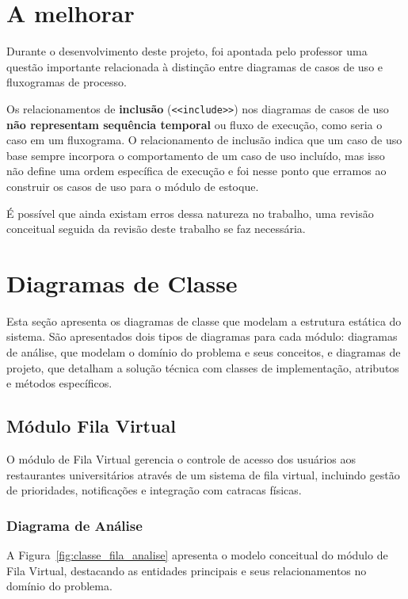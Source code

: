 \documentclass[12pt,a4paper]{article}
\begin{document}
\newpage
\section{A melhorar}


Durante o desenvolvimento deste projeto, foi apontada pelo professor uma questão importante relacionada à distinção entre diagramas de casos de uso e fluxogramas de processo. 

Os relacionamentos de \textbf{inclusão} (\texttt{<<include>>}) nos diagramas de casos de uso \textbf{não representam sequência temporal} ou fluxo de execução, como seria o caso em um fluxograma. O relacionamento de inclusão indica que um caso de uso base sempre incorpora o comportamento de um caso de uso incluído, mas isso não define uma ordem específica de execução e foi nesse ponto que erramos ao construir os casos de uso para o módulo de estoque. 

É possível que ainda existam erros dessa natureza no trabalho, uma revisão conceitual seguida da revisão deste trabalho se faz necessária.

\newpage
\section{Diagramas de Classe}

Esta seção apresenta os diagramas de classe que modelam a estrutura estática do sistema. São apresentados dois tipos de diagramas para cada módulo: diagramas de análise, que modelam o domínio do problema e seus conceitos, e diagramas de projeto, que detalham a solução técnica com classes de implementação, atributos e métodos específicos.

\subsection{Módulo Fila Virtual}

O módulo de Fila Virtual gerencia o controle de acesso dos usuários aos restaurantes universitários através de um sistema de fila virtual, incluindo gestão de prioridades, notificações e integração com catracas físicas.

\subsubsection{Diagrama de Análise}

A Figura~\ref{fig:classe_fila_analise} apresenta o modelo conceitual do módulo de Fila Virtual, destacando as entidades principais e seus relacionamentos no domínio do problema.
\end{document}

